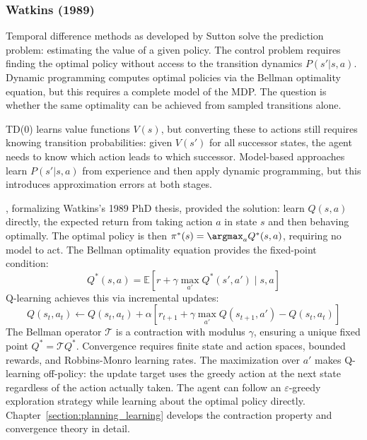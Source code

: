 \subsubsection{Watkins (1989)}

Temporal difference methods as developed by Sutton solve the prediction problem: estimating the value of a given policy. The control problem requires finding the optimal policy without access to the transition dynamics $P(s'|s,a)$. Dynamic programming computes optimal policies via the Bellman optimality equation, but this requires a complete model of the MDP. The question is whether the same optimality can be achieved from sampled transitions alone.

TD(0) learns value functions $V(s)$, but converting these to actions still requires knowing transition probabilities: given $V(s')$ for all successor states, the agent needs to know which action leads to which successor. Model-based approaches learn $P(s'|s,a)$ from experience and then apply dynamic programming, but this introduces approximation errors at both stages.

\citet{WatkinsDayan1992}, formalizing Watkins's 1989 PhD thesis, provided the solution: learn $Q(s,a)$ directly, the expected return from taking action $a$ in state $s$ and then behaving optimally. The optimal policy is then $\pi^*(s) = \argmax_a Q^*(s,a)$, requiring no model to act. The Bellman optimality equation provides the fixed-point condition:
\begin{equation}
Q^*(s,a) = \mathbb{E}\left[r + \gamma \max_{a'} Q^*(s',a') \mid s, a\right]
\end{equation}
Q-learning achieves this via incremental updates:
\begin{equation}
Q(s_t, a_t) \leftarrow Q(s_t, a_t) + \alpha \left[ r_{t+1} + \gamma \max_{a'} Q(s_{t+1}, a') - Q(s_t, a_t) \right]
\end{equation}
The Bellman operator $\mathcal{T}$ is a contraction with modulus $\gamma$, ensuring a unique fixed point $Q^* = \mathcal{T}Q^*$. Convergence requires finite state and action spaces, bounded rewards, and Robbins-Monro learning rates. The maximization over $a'$ makes Q-learning off-policy: the update target uses the greedy action at the next state regardless of the action actually taken. The agent can follow an $\varepsilon$-greedy exploration strategy while learning about the optimal policy directly. Chapter~\ref{section:planning_learning} develops the contraction property and convergence theory in detail.


